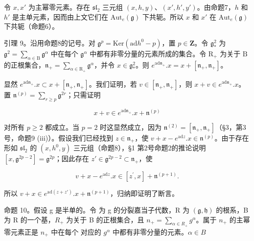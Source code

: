 令 \(x, x'\) 为主幂零元素。存在 \(\mathfrak{sl}_2\) 三元组 \((x, h, y)\)、\((x', h', y')\)。由命题7，\(h\) 和 \(h'\) 是主单元素，因而由上文它们在 \(\mathrm{Aut}_e(\mathfrak{g})\) 下共轭。所以 \(x\) 和 \(x'\) 在 \(\mathrm{Aut}_e(\mathfrak{g})\) 下共轭（命题6）。

引理 9。沿用命题8的记号。对 \(\mathfrak{g}^p = \mathrm{Ker}(\mathrm{ad}h^0 - p)\)，置 \(p \in \mathbf{Z}\)。令 \(\mathfrak{g}_*^2\) 为 \(\mathfrak{g}^2 = \sum_{\alpha \in \mathrm{B}} \mathfrak{g}^\alpha\) 中在每个 \(\mathfrak{g}^\alpha\) 中都有非零分量的元素所成的集合。令 \(\mathrm{R}_+\) 为关于 \(\mathrm{B}\) 的正根集合，\(\mathfrak{n}_+ = \sum_{\alpha \in \mathrm{R}_+} \mathfrak{g}^\alpha\)，并令 \(x \in \mathfrak{g}_*^2\)。则 \(e^{\mathrm{ad}\mathfrak{n}_+}. x = x + [\mathfrak{n}_+, \mathfrak{n}_+]\)。

显然 \(e^{\mathrm{ad} \mathfrak{n}_+}.x \subset x + [\mathfrak{n}_+, \mathfrak{n}_+]\)。我们证明，若 \(v \in [\mathfrak{n}_+, \mathfrak{n}_+]\)，则 \(x + v \in e^{\mathrm{ad} \mathfrak{n}_+}.x\)。置 \(\mathfrak{n}^{(p)} = \sum_{r \geq p} \mathfrak{g}^{2r}\)；只需证明

\[
x + v \in e ^ {\mathrm{ad} \mathfrak {n} _ {+}}. x + \mathfrak {n} ^ {(p)}
\]

对所有 \(p \geq 2\) 都成立。当 \(p = 2\) 时这显然成立，因为 \(\mathfrak{n}^{(2)} = [\mathfrak{n}_+, \mathfrak{n}_+]\)（§3，第3号，命题9 (iii)）。假设我们已经找到 \(z \in \mathfrak{n}_+\)，使 \(v + x - e^{\mathrm{ad}z}.x \in \mathfrak{n}^{(p)}\)。由于存在形如 \(\mathfrak{sl}_2\) 的 \((x, h^0, y)\) 三元组（命题8），§1 第2号命题2的推论说明 \([x, \mathfrak{g}^{2p-2}] = \mathfrak{g}^{2p}\)；因此存在 \(z' \in \mathfrak{g}^{2p-2} \subset \mathfrak{n}_+\)，使

\[
v + x - e ^ {\mathrm{ad} z}. x \in [ z ^ {\prime}, x ] + \mathfrak {n} ^ {(p + 1)}.
\]

所以 \(v + x \in e^{\mathrm{ad}(z + z')}.x + \mathfrak{n}^{(p + 1)}\)，归纳即证明了断言。

命题 10。假设 g 是半单的。令  为 g 的分裂嘉当子代数，R 为 \((\mathfrak{g},\mathfrak{h})\) 的根系，B 为 R 的一个基，\(R_{+}\) 为关于 B 的正根集合，且 \(n_{+}=\sum_{\alpha\in R_{+}}g^{\alpha}\)。属于 \(n_{+}\) 的主幂零元素正是 \(n_{+}\) 中在每个  对应的 \(g^{\alpha}\) 中都有非零分量的元素。\(\alpha\in B\)

